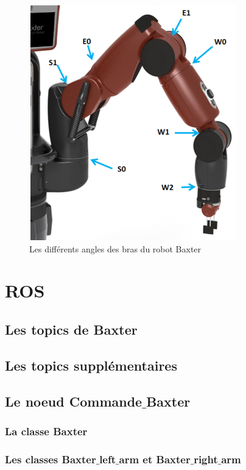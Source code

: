 \documentclass[a4paper,french, titlepage]{article}
\begin{document}
\begin{figure}[H] 
\begin{center}
\includegraphics[scale=0.7]{Images/Baxter_arm.png} 
\end{center}
\caption{Les différents angles des bras du robot Baxter}
\label{Baxter_arm}
\end{figure} 


\newpage
\section{ROS}

\subsection{Les topics de Baxter}


\subsection{Les topics supplémentaires}


\subsection{Le noeud Commande$\_$Baxter}


\subsubsection{La classe Baxter}

\subsubsection{Les classes Baxter$\_$left$\_$arm et Baxter$\_$right$\_$arm}
\end{document}
